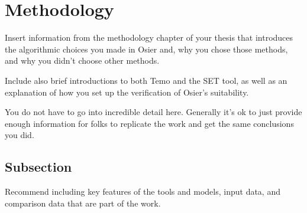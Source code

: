 \section{Methodology}

Insert information from the methodology chapter of your thesis that introduces 
the algorithmic choices you made in Osier and, why you chose those methods, and 
why you didn't choose other methods.

Include also brief introductions to both Temo and the SET tool, as well as an 
explanation of how you set up the verification of Osier's suitability. 

You do not have to go into incredible detail here. Generally it's ok to just 
provide enough information for folks to replicate the work and get the same 
conclusions you did. 

\subsection{Subsection}
Recommend including key features of the tools and models, input data, and 
comparison data that are part of the work.

